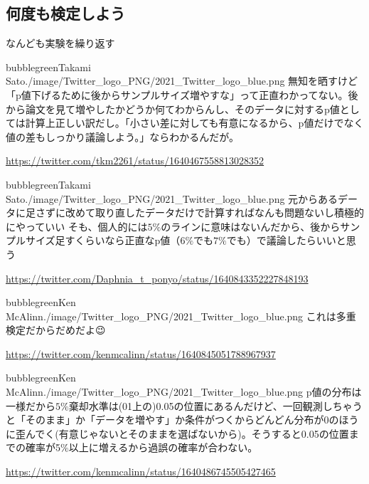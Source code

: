 \subsection{何度も検定しよう}


\begin{SMbox}{なんども実験を繰り返す}
\begin{rightbubbles}{bubblegreen}{Takami Sato}{./image/Twitter_logo_PNG/2021_Twitter_logo_blue.png}
    無知を晒すけど「p値下げるために後からサンプルサイズ増やすな」って正直わかってない。後から論文を見て増やしたかどうか何てわからんし、そのデータに対するp値としては計算上正しい訳だし。「小さい差に対しても有意になるから、p値だけでなく値の差もしっかり議論しよう。」ならわかるんだが。
    \begin{flushright} 
        \small	\url{https://twitter.com/tkm2261/status/1640467558813028352}
        \end{flushright}  
\end{rightbubbles}

\begin{rightbubbles}{bubblegreen}{Takami Sato}{./image/Twitter_logo_PNG/2021_Twitter_logo_blue.png}
    元からあるデータに足さずに改めて取り直したデータだけで計算すればなんも問題ないし積極的にやっていい
    そも、個人的には$5\%$のラインに意味はないんだから、後からサンプルサイズ足すくらいなら正直なp値（$6\%$でも$7\%$でも）で議論したらいいと思う
    \begin{flushright} 
        \small	\url{https://twitter.com/Daphnia_t_ponyo/status/1640843352227848193}
        \end{flushright}  
\end{rightbubbles}

\begin{rightbubbles}{bubblegreen}{Ken McAlinn}{./image/Twitter_logo_PNG/2021_Twitter_logo_blue.png}
    これは多重検定だからだめだよ😉
\begin{flushright} 
\small	\url{https://twitter.com/kenmcalinn/status/1640845051788967937}
\end{flushright}    
\end{rightbubbles}


\begin{rightbubbles}{bubblegreen}{Ken McAlinn}{./image/Twitter_logo_PNG/2021_Twitter_logo_blue.png}
  p値の分布は一様だから$5\%$棄却水準は(01上の)0.05の位置にあるんだけど、一回観測しちゃうと「そのまま」か「データを増やす」か条件がつくからどんどん分布が0のほうに歪んでく(有意じゃないとそのままを選ばないから)。そうすると0.05の位置までの確率が5$\%$以上に増えるから過誤の確率が合わない。
\begin{flushright} 
\small	\url{https://twitter.com/kenmcalinn/status/1640486745505427465}
\end{flushright}    
\end{rightbubbles}



\end{SMbox}
